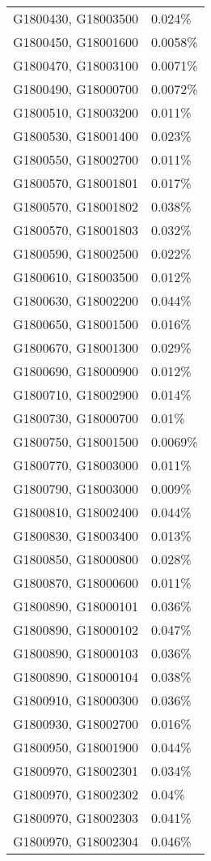 \begin{longtable}[]{@{}ll@{}}
G1800430, G18003500 & 0.024\% \\
G1800450, G18001600 & 0.0058\% \\
G1800470, G18003100 & 0.0071\% \\
G1800490, G18000700 & 0.0072\% \\
G1800510, G18003200 & 0.011\% \\
G1800530, G18001400 & 0.023\% \\
G1800550, G18002700 & 0.011\% \\
G1800570, G18001801 & 0.017\% \\
G1800570, G18001802 & 0.038\% \\
G1800570, G18001803 & 0.032\% \\
G1800590, G18002500 & 0.022\% \\
G1800610, G18003500 & 0.012\% \\
G1800630, G18002200 & 0.044\% \\
G1800650, G18001500 & 0.016\% \\
G1800670, G18001300 & 0.029\% \\
G1800690, G18000900 & 0.012\% \\
G1800710, G18002900 & 0.014\% \\
G1800730, G18000700 & 0.01\% \\
G1800750, G18001500 & 0.0069\% \\
G1800770, G18003000 & 0.011\% \\
G1800790, G18003000 & 0.009\% \\
G1800810, G18002400 & 0.044\% \\
G1800830, G18003400 & 0.013\% \\
G1800850, G18000800 & 0.028\% \\
G1800870, G18000600 & 0.011\% \\
G1800890, G18000101 & 0.036\% \\
G1800890, G18000102 & 0.047\% \\
G1800890, G18000103 & 0.036\% \\
G1800890, G18000104 & 0.038\% \\
G1800910, G18000300 & 0.036\% \\
G1800930, G18002700 & 0.016\% \\
G1800950, G18001900 & 0.044\% \\
G1800970, G18002301 & 0.034\% \\
G1800970, G18002302 & 0.04\% \\
G1800970, G18002303 & 0.041\% \\
G1800970, G18002304 & 0.046\% \\

\end{longtable}
